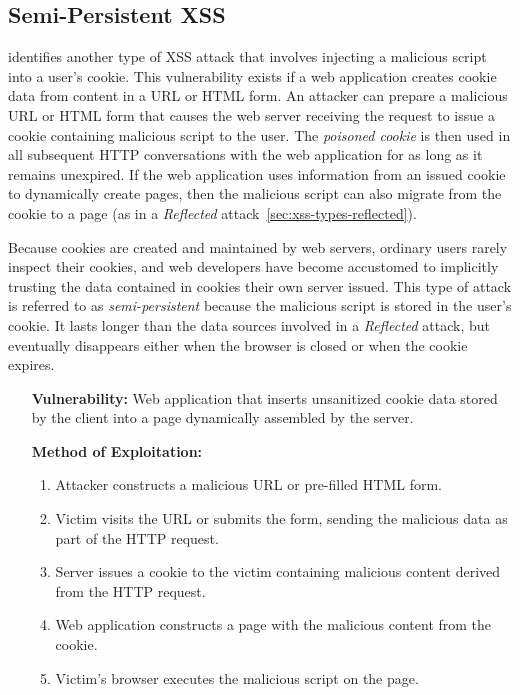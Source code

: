 \documentclass{acmtrans2m}
\begin{document}
\subsection{Semi-Persistent XSS}\label{sec:xss-types-semipersistent}
 identifies another type of XSS attack that involves injecting a malicious script into a user's cookie.
This vulnerability exists if a web application creates cookie data from content in a URL or HTML form.
An attacker can prepare a malicious URL or HTML form that causes the web server receiving the request to issue a cookie containing malicious script to the user.
The \emph{poisoned cookie} is then used in all subsequent HTTP conversations with the web application for as long as it remains unexpired.
If the web application uses information from an issued cookie to dynamically create pages, then the malicious script can also migrate from the cookie to a page (as in a \emph{Reflected} attack~\ref{sec:xss-types-reflected}).

Because cookies are created and maintained by web servers, ordinary users rarely inspect their cookies, and web developers have become accustomed to implicitly trusting the data contained in cookies their own server issued.
This type of attack is referred to as \emph{semi-persistent} because the malicious script is stored in the user's cookie.
It lasts longer than the data sources involved in a \emph{Reflected} attack, but eventually disappears either when the browser is closed or when the cookie expires.

\begin{itemize}
 \item[\textbf{Vulnerability:}] Web application that inserts unsanitized cookie data stored by the client into a page dynamically assembled by the server.
 \item[\textbf{Method of Exploitation:}]~
  \begin{enumerate}
   \item Attacker constructs a malicious URL or pre-filled HTML form.
   \item Victim visits the URL or submits the form, sending the malicious data as part of the HTTP request.
   \item Server issues a cookie to the victim containing malicious content derived from the HTTP request.
   \item Web application constructs a page with the malicious content from the cookie.
   \item Victim's browser executes the malicious script on the page.
  \end{enumerate}
\end{itemize}
\end{document}
